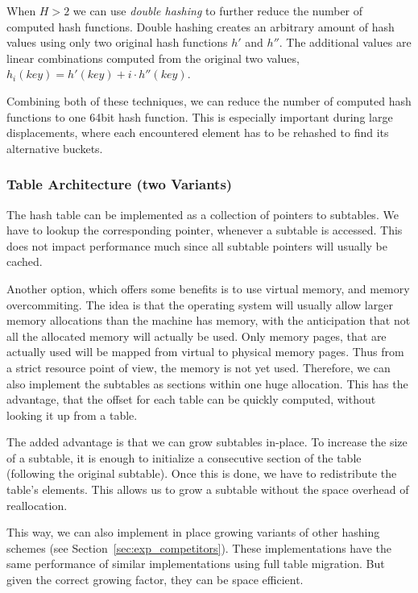 \documentclass[a4paper,UKenglish]{lipics-v2016}
\begin{document}
When $H > 2$ we can use \emph{double hashing} to further reduce the number
of computed hash functions. Double hashing creates an arbitrary amount
of hash values using only two original hash functions $h'$ and
$h''$.  The additional values are linear combinations computed
from the original two values, $h_i(key) = h'(key) + i\cdot
h''(key)$.

Combining both of these techniques, we can reduce the number of
computed hash functions to one 64bit hash function.  This is
especially important during large displacements, where each
encountered element has to be rehashed to find its alternative
buckets.

\subsubsection*{Table Architecture (two Variants)}
\label{sec:dys_inplace}
The hash table can be implemented as a collection of pointers to
subtables. We have to lookup the corresponding pointer, whenever a
subtable is accessed.  This does not impact performance much since all
subtable pointers will usually be cached.

Another option, which offers some benefits is to use virtual memory,
and memory overcommiting.  The idea is that the operating system will
usually allow larger memory allocations than the machine has memory,
with the anticipation that not all the allocated memory will actually
be used.  Only memory pages, that are actually used will be mapped
from virtual to physical memory pages.  Thus from a strict resource
point of view, the memory is not yet used.  Therefore, we can also
implement the subtables as sections within one huge allocation.  This
has the advantage, that the offset for each table can be quickly
computed, without looking it up from a table.

The added advantage is that we can grow subtables in-place.  To
increase the size of a subtable, it is enough to initialize a
consecutive section of the table (following the original subtable).
Once this is done, we have to redistribute the table's elements.  This
allows us to grow a subtable without the space overhead of
reallocation.

This way, we can also implement in place growing variants of other
hashing schemes (see Section~\ref{sec:exp_competitors}).  These
implementations have the same performance of similar implementations
using full table migration.  But given the correct growing factor,
they can be space efficient.
\end{document}
